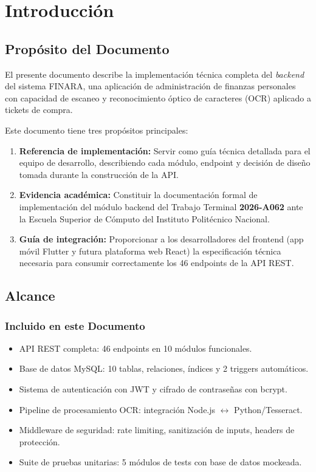 \chapter{Introducción}

\section{Propósito del Documento}

El presente documento describe la implementación técnica completa del \textit{backend} del sistema FINARA, una aplicación de administración de finanzas personales con capacidad de escaneo y reconocimiento óptico de caracteres (OCR) aplicado a tickets de compra.

Este documento tiene tres propósitos principales:

\begin{enumerate}[leftmargin=1.5cm]
  \item \textbf{Referencia de implementación:} Servir como guía técnica detallada para el equipo de desarrollo, describiendo cada módulo, endpoint y decisión de diseño tomada durante la construcción de la API.

  \item \textbf{Evidencia académica:} Constituir la documentación formal de implementación del módulo backend del Trabajo Terminal \textbf{2026-A062} ante la Escuela Superior de Cómputo del Instituto Politécnico Nacional.

  \item \textbf{Guía de integración:} Proporcionar a los desarrolladores del frontend (app móvil Flutter y futura plataforma web React) la especificación técnica necesaria para consumir correctamente los 46 endpoints de la API REST.
\end{enumerate}

\section{Alcance}

\subsection{Incluido en este Documento}

\begin{itemize}[leftmargin=1.5cm]
  \item API REST completa: 46 endpoints en 10 módulos funcionales.
  \item Base de datos MySQL: 10 tablas, relaciones, índices y 2 triggers automáticos.
  \item Sistema de autenticación con JWT y cifrado de contraseñas con bcrypt.
  \item Pipeline de procesamiento OCR: integración Node.js $\leftrightarrow$ Python/Tesseract.
  \item Middleware de seguridad: rate limiting, sanitización de inputs, headers de protección.
  \item Suite de pruebas unitarias: 5 módulos de tests con base de datos mockeada.
\end{itemize}


